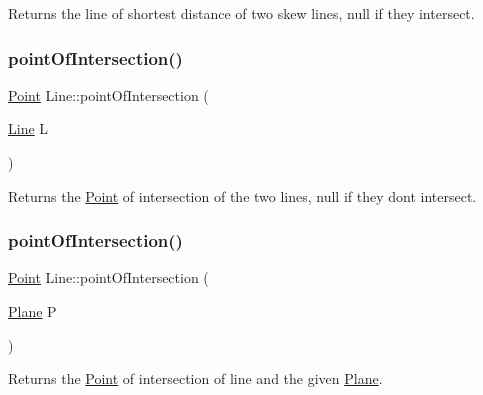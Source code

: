 Returns the line of shortest distance of two skew lines, null if they intersect. 

\mbox{\label{class_line_a3abb028a100196d85dd2674c3ef86421}} 
\subsubsection{\texorpdfstring{point\+Of\+Intersection()}{pointOfIntersection()}\hspace{0.1cm}{\footnotesize\ttfamily [1/2]}}
{\footnotesize\ttfamily \mbox{\hyperlink{class_point}{Point}} Line\+::point\+Of\+Intersection (\begin{DoxyParamCaption}\item[{\mbox{\hyperlink{class_line}{Line}}}]{L }\end{DoxyParamCaption})}



Returns the \mbox{\hyperlink{class_point}{Point}} of intersection of the two lines, null if they don\textquotesingle{}t intersect. 

\mbox{\label{class_line_af5a77b743d209b9aad7b92d1fe2b786a}} 
\subsubsection{\texorpdfstring{point\+Of\+Intersection()}{pointOfIntersection()}\hspace{0.1cm}{\footnotesize\ttfamily [2/2]}}
{\footnotesize\ttfamily \mbox{\hyperlink{class_point}{Point}} Line\+::point\+Of\+Intersection (\begin{DoxyParamCaption}\item[{\mbox{\hyperlink{class_plane}{Plane}}}]{P }\end{DoxyParamCaption})}



Returns the \mbox{\hyperlink{class_point}{Point}} of intersection of line and the given \mbox{\hyperlink{class_plane}{Plane}}. 

\mbox{\label{class_line_af20457df1ce948794350fab12c16ee14}} 
